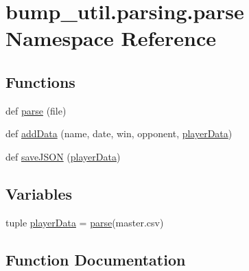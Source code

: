 \hypertarget{namespacebump__util_1_1parsing_1_1parse}{}\section{bump\+\_\+util.\+parsing.\+parse Namespace Reference}
\label{namespacebump__util_1_1parsing_1_1parse}
\subsection*{Functions}
\begin{DoxyCompactItemize}
\item 
def \hyperlink{namespacebump__util_1_1parsing_1_1parse_a965ba7fedf49b7845f4ab4d19d18a5fc}{parse} (file)
\item 
def \hyperlink{namespacebump__util_1_1parsing_1_1parse_ae5c6216eae0b8ff0bea45698524fc1ee}{add\+Data} (name, date, win, opponent, \hyperlink{namespacebump__util_1_1parsing_1_1parse_a1756538211b354ec3ce3cbc75833b10a}{player\+Data})
\item 
def \hyperlink{namespacebump__util_1_1parsing_1_1parse_a6cfcea27bba0b203aa85aacb8631980e}{save\+J\+S\+O\+N} (\hyperlink{namespacebump__util_1_1parsing_1_1parse_a1756538211b354ec3ce3cbc75833b10a}{player\+Data})
\end{DoxyCompactItemize}
\subsection*{Variables}
\begin{DoxyCompactItemize}
\item 
tuple \hyperlink{namespacebump__util_1_1parsing_1_1parse_a1756538211b354ec3ce3cbc75833b10a}{player\+Data} = \hyperlink{namespacebump__util_1_1parsing_1_1parse_a965ba7fedf49b7845f4ab4d19d18a5fc}{parse}(\textquotesingle{}master.\+csv\textquotesingle{})
\end{DoxyCompactItemize}


\subsection{Function Documentation}
\hypertarget{namespacebump__util_1_1parsing_1_1parse_ae5c6216eae0b8ff0bea45698524fc1ee}{}

